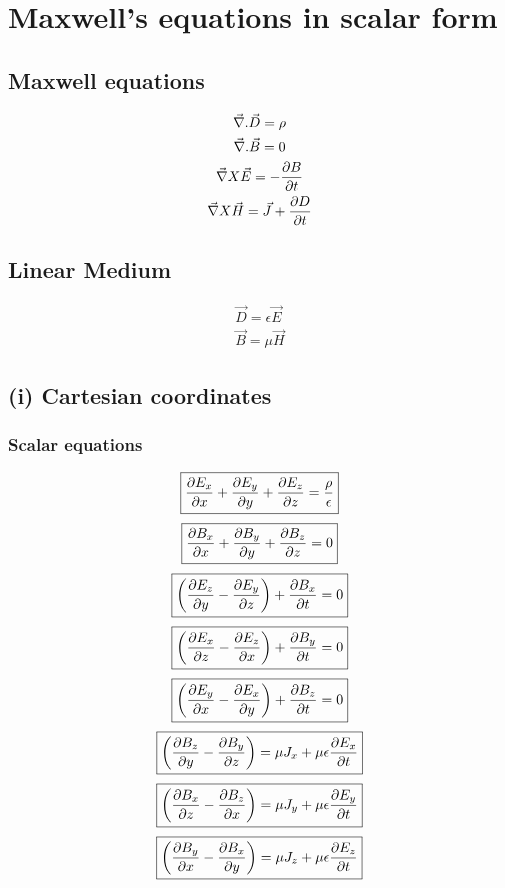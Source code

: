 \documentclass[11pt, a4paper]{article}
\begin{document}
\section{Maxwell's equations in scalar form}
\subsection*{Maxwell equations}
\begin{gather}  
   \vec{\nabla}.\vec{D} = \rho\\
   \vec{\nabla}. \vec{B} = 0 \\
   \vec{\nabla}X\vec{E}  = -\pdv{B}{t}\\
   \vec{\nabla}X\vec{H} = \vec{J}+\pdv{D}{t}
\end{gather}
\subsection*{Linear Medium}
\begin{gather}
    \vec{D} = \epsilon \vec{E}\\
    \vec{B} = \mu \vec{H}
\end{gather}
\subsection*{(i) Cartesian coordinates}

\subsubsection*{Scalar equations}
\begin{equation}
    \boxed{\pdv{ E_{x} }{x}+\pdv{ E_{y} }{y}+\pdv{ E_{z} }{z} = \frac{\rho}{\epsilon}}
\end{equation}
\begin{equation}
    \boxed{\pdv{B_{x} }{x}+\pdv{B_{y} }{y}+\pdv{B_{z} }{z} = 0}
\end{equation}
\begin{equation}
    \boxed{\left(\pdv{E_{z} }{y}-\pdv{E_{y} }{z}\right)+\pdv{B_{x} }{t}=0}
\end{equation}
\begin{equation}
    \boxed{ \left(\pdv{E_{x} }{z}-\pdv{E_{z} }{x}\right)+\pdv{B_{y} }{t}=0}
\end{equation}
\begin{equation}
    \boxed{\left(\pdv{E_{y} }{x}-\pdv{E_{x} }{y}\right)+\pdv{B_{z} }{t}=0}
\end{equation}
\begin{equation}
    \boxed{\left(\pdv{B_{z} }{y}-\pdv{B_{y} }{z}\right)=\mu J_x + \mu\epsilon \pdv{E_x}{t}}
\end{equation}
\begin{equation}
    \boxed{\left(\pdv{B_{x} }{z}-\pdv{B_{z} }{x}\right)= \mu J_y + \mu\epsilon \pdv{E_y}{t}}
\end{equation}
\begin{equation}
    \boxed{\left(\pdv{B_{y} }{x}-\pdv{B_{x} }{y}\right)=\mu J_z + \mu\epsilon \pdv{E_z}{t} }
\end{equation}
\end{document}
